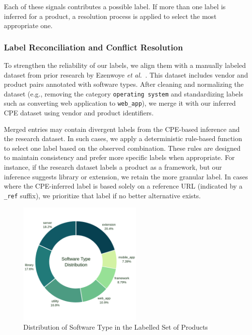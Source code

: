 Each of these signals contributes a possible label. If more than one label is inferred for a product, a resolution process is applied to select the most appropriate one.


\subsubsection{Label Reconciliation and Conflict Resolution}
To strengthen the reliability of our labels, we align them with a manually labeled dataset from prior research by Ezenwoye \textit{et al.}~\cite{Ezenwoye2020ClassifyingCS}. This dataset includes vendor and product pairs annotated with software types. After cleaning and normalizing the dataset (e.g., removing the category \texttt{operating system} and standardizing labels such as converting web application to \texttt{web\_app}), we merge it with our inferred CPE dataset using vendor and product identifiers.

Merged entries may contain divergent labels from the CPE-based inference and the research dataset. In such cases, we apply a deterministic rule-based function to select one label based on the observed combination. These rules are designed to maintain consistency and prefer more specific labels when appropriate. For instance, if the research dataset labels a product as a framework, but our inference suggests library or extension, we retain the more granular label. In cases where the CPE-inferred label is based solely on a reference URL (indicated by a \texttt{\_ref} suffix), we prioritize that label if no better alternative exists.

\begin{figure}[!h]
	\centering
    \includegraphics[width=0.55\textwidth]{figures/chapter_2/software_type_distribution_donut.png}
	\caption{Distribution of Software Type in the Labelled Set of Products}
	\label{fig:software_type_distribution}
\end{figure}


